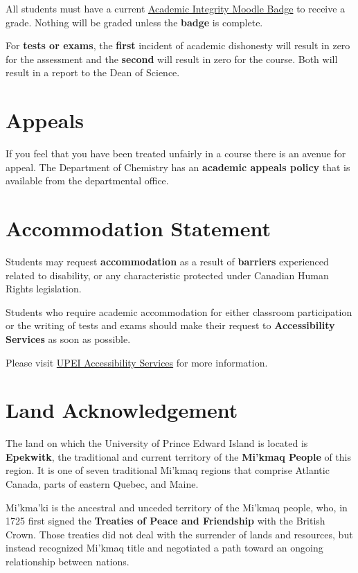 All students must have a current \href{https://library.upei.ca/ai/home}{Academic Integrity Moodle Badge} to receive a grade. Nothing will be graded unless the \textbf{badge} is complete.

For \textbf{tests or exams}, the \textbf{first} incident of academic dishonesty will result in zero for the assessment and the \textbf{second} will result in zero for the course. Both will result in a report to the Dean of Science.

\section{Appeals}

If you feel that you have been treated unfairly in a course there is an avenue for appeal. The Department of Chemistry has an \textbf{academic appeals policy} that is available from the departmental office.

\section{Accommodation Statement}

Students may request \textbf{accommodation} as a result of \textbf{barriers} experienced related to disability, or any characteristic protected under Canadian Human Rights legislation.

Students who require academic accommodation for either classroom participation or the writing of tests and exams should make their request to \textbf{Accessibility Services} as soon as possible.

Please visit \href{https://upei.ca/accessibility}{UPEI Accessibility Services} for more information.

\section{Land Acknowledgement}

The land on which the University of Prince Edward Island is located is \textbf{Epekwitk}, the traditional and current territory of the \textbf{Mi'kmaq People} of this region. It is one of seven traditional Mi'kmaq regions that comprise Atlantic Canada, parts of eastern Quebec, and Maine.

Mi'kma'ki is the ancestral and unceded territory of the Mi'kmaq people, who, in 1725 first signed the \textbf{Treaties of Peace and Friendship} with the British Crown. Those treaties did not deal with the surrender of lands and resources, but instead recognized Mi'kmaq title and negotiated a path toward an ongoing relationship between nations.

